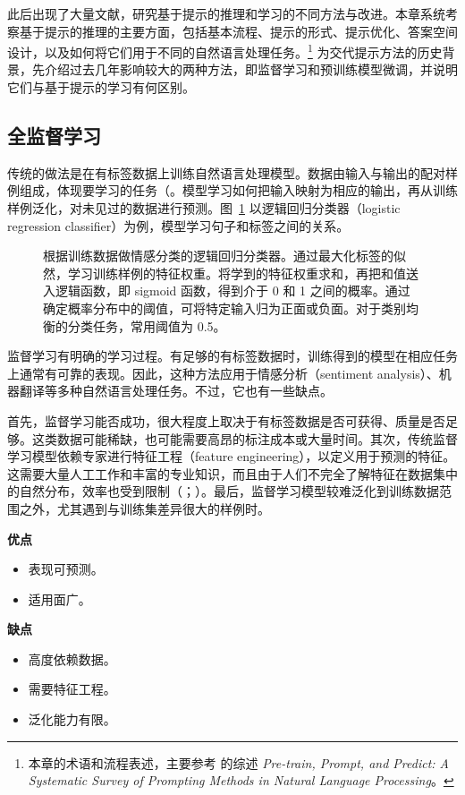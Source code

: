 此后出现了大量文献，研究基于提示的推理和学习的不同方法与改进。本章系统考察基于提示的推理的主要方面，包括基本流程、提示的形式、提示优化、答案空间设计，以及如何将它们用于不同的自然语言处理任务。\footnote{本章的术语和流程表述，主要参考 的综述 \textit{Pre-train, Prompt, and Predict: A Systematic Survey of Prompting Methods in Natural Language Processing}。} 为交代提示方法的历史背景，先介绍过去几年影响较大的两种方法，即监督学习和预训练模型微调，并说明它们与基于提示的学习有何区别。

\subsection{全监督学习}
传统的做法是在有标签数据上训练自然语言处理模型。数据由输入与输出的配对样例组成，体现要学习的任务（。模型学习如何把输入映射为相应的输出，再从训练样例泛化，对未见过的数据进行预测。图~\ref{fig:ch03-supervised} 以逻辑回归分类器（logistic regression classifier）为例，模型学习句子和标签之间的关系。

\begin{figure}[!htbp]
\centering

\caption{根据训练数据做情感分类的逻辑回归分类器。通过最大化标签的似然，学习训练样例的特征权重。将学到的特征权重求和，再把和值送入逻辑函数，即 sigmoid 函数，得到介于 0 和 1 之间的概率。通过确定概率分布中的阈值，可将特定输入归为正面或负面。对于类别均衡的分类任务，常用阈值为 0.5。}
\label{fig:ch03-supervised}
\end{figure}

监督学习有明确的学习过程。有足够的有标签数据时，训练得到的模型在相应任务上通常有可靠的表现。因此，这种方法应用于情感分析（sentiment analysis）、机器翻译等多种自然语言处理任务。不过，它也有一些缺点。

首先，监督学习能否成功，很大程度上取决于有标签数据是否可获得、质量是否足够。这类数据可能稀缺，也可能需要高昂的标注成本或大量时间。其次，传统监督学习模型依赖专家进行特征工程（feature engineering），以定义用于预测的特征。这需要大量人工工作和丰富的专业知识，而且由于人们不完全了解特征在数据集中的自然分布，效率也受到限制（；）。最后，监督学习模型较难泛化到训练数据范围之外，尤其遇到与训练集差异很大的样例时。

\begin{keypoint}
\noindent\textbf{优点}
\begin{itemize}
\item 表现可预测。
\item 适用面广。
\end{itemize}
\noindent\textbf{缺点}
\begin{itemize}
\item 高度依赖数据。
\item 需要特征工程。
\item 泛化能力有限。
\end{itemize}
\end{keypoint}

